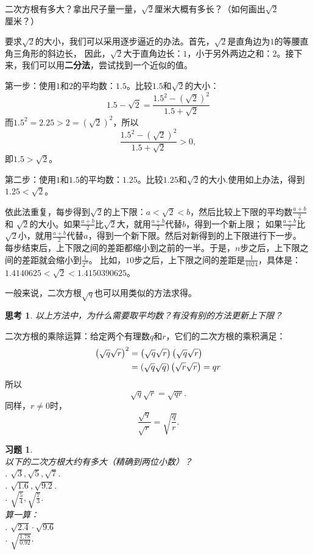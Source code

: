 \documentclass[12pt,UTF8]{ctexbook}
\newtheorem{sk}{思考}[section]
\newtheorem{xt}{习题}[section]
\begin{document}
二次方根有多大？拿出尺子量一量，$\sqrt{2}$厘米大概有多长？（如何画出$\sqrt{2}$厘米？）

要求$\sqrt{2}$的大小，我们可以采用逐步逼近的办法。首先，$\sqrt{2}$是直角边为$1$的等腰直角三角形的斜边长，
因此，$\sqrt{2}$大于直角边长：$1$，小于另外两边之和：$2$。接下来，我们可以用\textbf{二分法}，尝试找到一个近似的值。

第一步：使用$1$和$2$的平均数：$1.5$。比较$1.5$和$\sqrt{2}$的大小：
$$ 1.5 - \sqrt{2} = \frac{1.5^2 - \left(\sqrt{2}\right)^2}{1.5 + \sqrt{2}} $$
而$1.5^2 = 2.25 > 2 = \left(\sqrt{2}\right)^2$，所以
$$ \frac{1.5^2 - \left(\sqrt{2}\right)^2}{1.5 + \sqrt{2}} > 0,$$
即$1.5 > \sqrt{2}$。

第二步：使用$1$和$1.5$的平均数：$1.25$。比较$1.25$和$\sqrt{2}$的大小.使用如上办法，得到
$1.25 < \sqrt{2}$。

依此法重复，每步得到$\sqrt{2}$的上下限：$a < \sqrt{2} < b$，然后比较上下限的平均数$\frac{a+b}{2}$和
$\sqrt{2}$的大小。如果$\frac{a+b}{2}$比$\sqrt{2}$大，就用$\frac{a+b}{2}$代替$b$，得到一个新上限；
如果$\frac{a+b}{2}$比$\sqrt{2}$小，就用$\frac{a+b}{2}$代替$a$，得到一个新下限。然后对新得到的上下限进行下一步。
每步结束后，上下限之间的差距都缩小到之前的一半。于是，$n$步之后，上下限之间的差距就会缩小到$\frac{1}{2^n}$。
比如，$10$步之后，上下限之间的差距是$\frac{1}{1024}$，具体是：$1.4140625 < \sqrt{2} < 1.4150390625$。

一般来说，二次方根$\sqrt{q}$也可以用类似的方法求得。
\begin{sk}\label{sk:3-2-0}
    以上方法中，为什么需要取平均数？有没有别的方法更新上下限？
\end{sk}

二次方根的乘除运算：给定两个有理数$q$和$r$，它们的二次方根的乘积满足：
\begin{align}
    \left(\sqrt{q}\sqrt{r}\right)^2 &=  \left(\sqrt{q}\sqrt{r}\right)\left(\sqrt{q}\sqrt{r}\right) \notag \\
    &= \left(\sqrt{q}\sqrt{q}\right)\left(\sqrt{r}\sqrt{r}\right) = qr \notag 
\end{align}
所以
$$\sqrt{q}\sqrt{r} = \sqrt{qr}.$$
同样，$r \neq 0$时，
$$\frac{\sqrt{q}}{\sqrt{r}} = \sqrt{\frac{q}{r}}.$$

\begin{xt}\label{xt:3-2-0}
    \mbox{}\\
    以下的二次方根大约有多大（精确到两位小数）？\\
    . $\sqrt{3}, \sqrt{5}, \sqrt{7}$.\\
    . $\sqrt{1.6}, \sqrt{9.2}$.\\
    . $\sqrt{\frac{5}{4}}, \sqrt{\frac{7}{3}}$.\\
    算一算：\\
    . $\sqrt{2.4} \cdot \sqrt{9.6}$\\
    . $\sqrt{\frac{1.78}{0.92}}.$
\end{xt}
\end{document}
